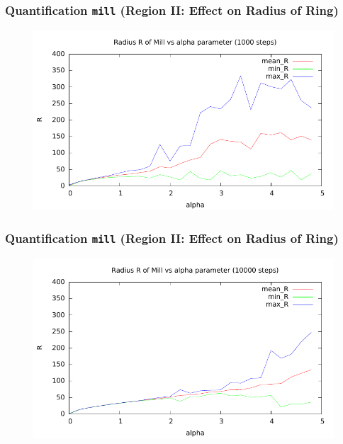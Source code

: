 \documentclass[compress]{beamer}
\begin{document}
\begin{frame}
	\frametitle{Quantification \texttt{mill}  \small (Region II: Effect on Radius of Ring)} \normalsize
\begin{figure}[H]
	\includegraphics[width=1. \columnwidth]{../plots/mill_II_radius_alpha_1000.pdf}
\end{figure}
\end{frame}

\begin{frame}
	\frametitle{Quantification \texttt{mill} \small (Region II: Effect on Radius of Ring)}
	\begin{figure}[H]
		\includegraphics[width=1. \columnwidth]{../plots/mill_II_radius_alpha_10000.pdf}
	\end{figure}
\end{frame}
\end{document}
